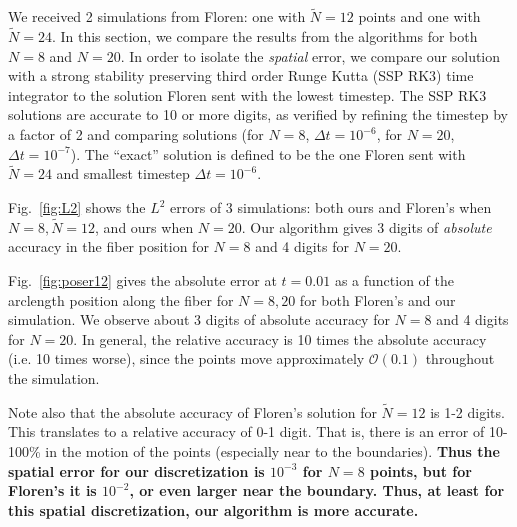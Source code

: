 We received 2 simulations from Floren: one with $\tilde{N}=12$ points and one with $\tilde{N}=24$. In this section, we compare the results from the algorithms for both $N=8$ and $N=20$. In order to isolate the \textit{spatial} error, we compare our solution with a strong stability preserving third order Runge Kutta (SSP RK3) time integrator to the solution Floren sent with the lowest timestep. The SSP RK3 solutions are accurate to 10 or more digits, as verified by refining the timestep by a factor of 2 and comparing solutions (for $N=8$, $\Delta t =10^{-6}$, for $N=20$, $\Delta t =10^{-7}$). The ``exact'' solution is defined to be the one Floren sent with $\tilde{N}=24$ and smallest timestep $\Delta t=10^{-6}$. 

Fig.\ \ref{fig:L2} shows the $L^2$ errors of 3 simulations: both ours and Floren's when $N=8, \tilde{N}=12$, and ours when $N=20$. Our algorithm gives 3 digits of \textit{absolute} accuracy in the fiber position for $N=8$ and 4 digits for $N=20$. 

Fig.\ \ref{fig:poser12} gives the absolute error at $t=0.01$ as a function of the arclength position along the fiber for $N=8, 20$ for both Floren's and our simulation. We observe about 3 digits of absolute accuracy for $N=8$ and 4 digits for $N=20$. In general, the relative accuracy is 10 times the absolute accuracy (i.e. 10 times worse), since the points move approximately $\mathcal{O}(0.1)$ throughout the simulation. 

Note also that the absolute accuracy of Floren's solution for $\tilde{N}=12$ is 1-2 digits. This translates to a relative accuracy of 0-1 digit. That is, there is an error of 10-100\% in the motion of the points (especially near to the boundaries). \textbf{Thus the spatial error for our discretization is $10^{-3}$ for $N=8$ points, but for Floren's it is $10^{-2}$, or even larger near the boundary. Thus, at least for this spatial discretization, our algorithm is more accurate. }


